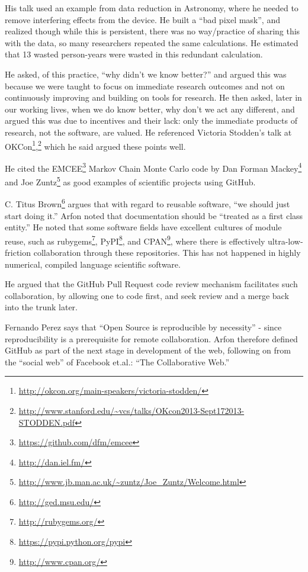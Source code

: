 \documentclass[11pt, oneside]{amsart}
\begin{document}
His talk used an example from data reduction in Astronomy, where he
needed to remove interfering effects from the device. He built a
``bad pixel mask'', and realized though while this is persistent, there
was no way/practice of sharing this with the data, so many researchers
repeated the same calculations. He estimated that 13 wasted person-years were wasted in
this redundant calculation.

He asked, of this practice, ``why didn't we know better?'' and argued
this was because we were taught to focus on immediate research outcomes
and not on continuously improving and building on tools for research. He
then asked, later in our working lives, when we do know better, why
don't we act any different, and argued this was due to incentives and their lack:
only the immediate products of research, not the software, are valued.
He referenced Victoria Stodden's talk at OKCon\footnote{\url{http://okcon.org/main-speakers/victoria-stodden/}},\footnote{\url{http://www.stanford.edu/~vcs/talks/OKcon2013-Sept172013-STODDEN.pdf}}
which he said argued these points well.

He cited the EMCEE\footnote{\url{https://github.com/dfm/emcee}} Markov Chain
Monte Carlo code by Dan Forman Mackey\footnote{\url{http://dan.iel.fm/}} and Joe Zuntz\footnote{\url{http://www.jb.man.ac.uk/~zuntz/Joe_Zuntz/Welcome.html}} as 
good examples of  scientific projects using GitHub.  

C. Titus Brown\footnote{\url{http://ged.msu.edu/}} argues that with regard to
reusable software, ``we should just start doing it.'' Arfon noted that
documentation should be ``treated as a first class entity.''
He noted that some software fields have excellent cultures of module
reuse, such as rubygems\footnote{\url{http://rubygems.org/}},
PyPI\footnote{\url{https://pypi.python.org/pypi}}, and CPAN\footnote{\url{http://www.cpan.org/}}, where there is effectively
ultra-low-friction collaboration through these repositories. This has
not happened in highly numerical, compiled language scientific software.

He argued that the GitHub Pull Request code review mechanism facilitates
such collaboration, by allowing one to code first, and seek review and a
merge back into the trunk later.

Fernando Perez says that ``Open Source
is reproducible by necessity'' - since reproducibility is a prerequisite
for remote collaboration.
Arfon therefore defined GitHub as part of the next stage in development
of the web, following on from the ``social web'' of Facebook et.al.:
``The Collaborative Web.''
\end{document}
